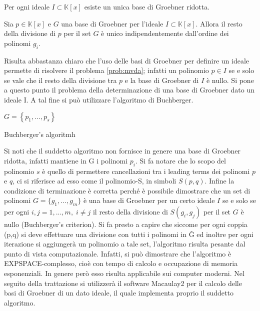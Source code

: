 \begin{prop}
	Per ogni ideale $I \subset \mathbb{K}[x]$ esiste un unica base di Groebner ridotta.
\end{prop}

\begin{prop}
	Sia $p \in \mathbb{K}[x]$ e $G$ una base di Groebner per l'ideale $I \subset \mathbb{K}[x]$. Allora il resto della divisione di $p$ per il set $G$ è unico indipendentemente dall'ordine dei polinomi $g_i$.
\end{prop}
Risulta abbastanza chiaro che l'uso delle basi di Groebner per definire un ideale permette di risolvere il problema \ref{prob:mvda}; infatti un polinomio $p \in I$ se e solo se vale che il resto della divisione tra $p$ e la base di Groebner di $I$ è nullo.
Si pone a questo punto il problema della determinazione di una base di Groebner dato un ideale I. A tal fine si può utilizzare l'algoritmo di Buchberger.

\begin{algorithm}[H]
	\SetAlgoLined
	$G = \left\lbrace p_1, ..., p_s \right\rbrace $\;
	
	\caption{Buchberger's algoritmh}
\end{algorithm}

\medskip
Si noti che il suddetto algoritmo non fornisce in genere una base di Groebner ridotta, infatti mantiene in G i polinomi $p_i$. 
Si fa notare che lo scopo del polinomio $s$ è quello di permettere cancellazioni tra i leading terms dei polinomi $p$ e $q$, ci si riferisce ad esso come il polinomio-S, in simboli $S(p,q)$. Infine la condizione di terminazione è corretta perché è possibile dimostrare che un set di polinomi $G = \{g_1, ..., g_m\}$ è una base di Groebner per un certo ideale $I$ se e solo se per ogni $i,j = 1,..., m , \; i\neq j$ il resto della divisione di $S(g_i, g_j)$ per il set $G$ è nullo (Buchberger's criterion). Si fa presto a capire che siccome per ogni coppia (p,q) si deve effettuare una divisione con tutti i polinomi in \^{G} ed inoltre per ogni iterazione si aggiungerà un polinomio a tale set, l'algoritmo risulta pesante dal punto di vista computazionale. Infatti, si può dimostrare che l'algoritmo è EXPSPACE-complesso, cioè con tempo di calcolo e occupazione di memoria esponenziali. In genere però esso risulta applicabile sui computer moderni.
Nel seguito della trattazione si utilizzerà il software Macaulay2 per il calcolo delle basi di Groebner di un dato ideale, il quale implementa proprio il suddetto algoritmo.

